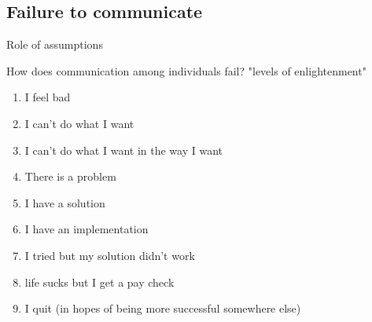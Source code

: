 \subsection{Failure to communicate}


Role of assumptions 

How does communication among individuals fail?
"levels of enlightenment"
\begin{enumerate}
    \item I feel bad
    \item I can't do what I want
    \item I can't do what I want in the way I want
    \item There is a problem
    \item I have a solution
    \item I have an implementation
    \item I tried but my solution didn't work
    \item life sucks but I get a pay check
    \item I quit (in hopes of being more successful somewhere else)
\end{enumerate}

